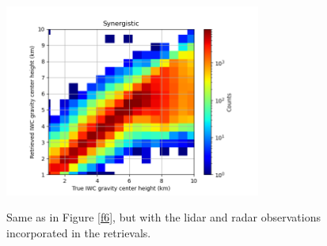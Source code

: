 \documentclass{ametsocV6.1}
\begin{document}
\begin{figure}[t]
    \centering
    \includegraphics[width=0.75\textwidth,angle=0]{fig10.rev.png}\\
    \caption{Same as in Figure \ref{f6}, but with the lidar and radar observations incorporated in the
    retrievals.}\label{f10}
\end{figure}
\end{document}
